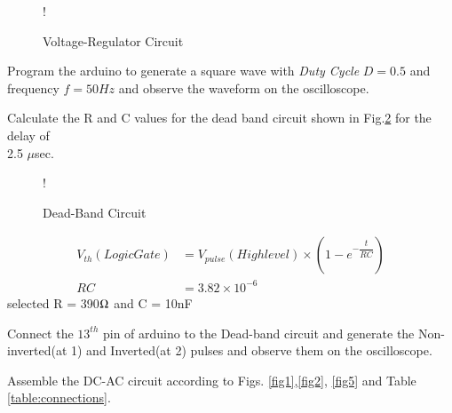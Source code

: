 \documentclass[journal,12pt,twocolumn]{IEEEtran}
\begin{document}
\begin{figure}[!h]
\centering
\resizebox {\columnwidth} {!} {

}
\caption{Voltage-Regulator Circuit} 
\label{fig3}
\end{figure}
\begin{problem}
Program the arduino to generate a square wave with {\em Duty Cycle} $D=0.5$ and frequency $f=50 Hz$ and observe the waveform on the oscilloscope. 
\end{problem}
\solution
 
\begin{problem}
Calculate the R and C values for the dead band circuit shown in Fig.\ref{fig4} for the delay of \\ 2.5 $\mu$sec.
\end{problem}
\begin{figure}[!h]
\centering
\resizebox {\columnwidth} {!} {

}
\caption{Dead-Band Circuit} 
\label{fig4}
\end{figure}
\solution
\begin{align*}
V_{th}(Logic Gate) &= V_{pulse}(High level) \times (1-e^{-\dfrac{t}{RC}})\\
RC &= 3.82 \times 10^{-6}
\end{align*}
selected  R = 390$\ohm$ and C = 10nF 
\begin{problem}
Connect the $13^{th}$ pin of arduino to the Dead-band circuit and generate the Non-inverted(at 1) and Inverted(at 2) pulses and observe them on the oscilloscope.
\end{problem}
\begin{problem}
Assemble the DC-AC circuit according to Figs. \ref{fig1},\ref{fig2}, \ref{fig5} and Table \ref{table:connections}.
\end{problem}
\end{document}
